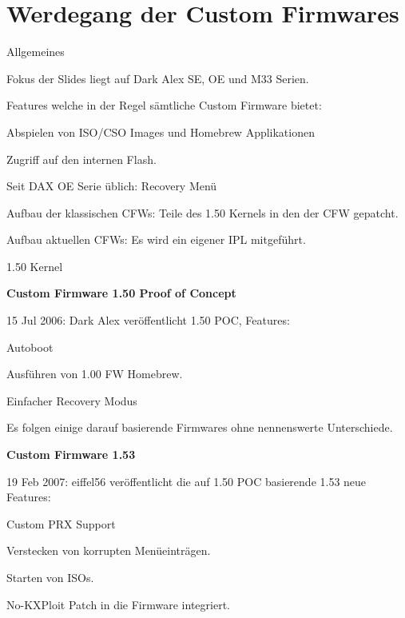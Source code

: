 \documentclass[mode=print,paper=screen,size=10pt,style=paintings]{powerdot}
\begin{document}
\section{Werdegang der Custom Firmwares}
\begin{slide}{Allgemeines}
	\begin{list}{-}{}
		\item{Fokus der Slides liegt auf Dark Alex SE, OE und M33 Serien.}
		\item{Features welche in der Regel sämtliche Custom Firmware bietet: \begin{list}{*}{}
				\item{Abspielen von ISO/CSO Images und Homebrew Applikationen}
				\item{Zugriff auf den internen Flash.}
				\item{Seit DAX OE Serie üblich: Recovery Menü}
			\end{list}}
		\item{Aufbau der klassischen CFWs: Teile des 1.50 Kernels in den der CFW gepatcht.}
		\item{Aufbau aktuellen CFWs: Es wird ein eigener IPL mitgeführt.}
	\end{list}
\end{slide}

\begin{slide}{1.50 Kernel}
	\begin{large}\textbf{Custom Firmware 1.50 Proof of Concept}\end{large}
	\begin{list}{-}{}
		\item{15 Jul 2006: Dark Alex veröffentlicht 1.50 POC, Features: \begin{list}{*}{}
				\item{Autoboot}
				\item{Ausführen von 1.00 FW Homebrew.}
				\item{Einfacher Recovery Modus}
			\end{list}}
		\item{Es folgen einige darauf basierende Firmwares ohne nennenswerte Unterschiede.}
	\end{list}
	\begin{large}\textbf{Custom Firmware 1.53}\end{large}
	\begin{list}{-}{}
		\item{19 Feb 2007: eiffel56 veröffentlicht die auf 1.50 POC basierende 1.53 neue Features: \begin{list}{*}{}
				\item{Custom PRX Support}
				\item{Verstecken von korrupten Menüeinträgen.}
				\item{Starten von ISOs.}
				\item{No-KXPloit Patch in die Firmware integriert.}
			\end{list}}
	\end{list}
\end{slide}
\end{document}
